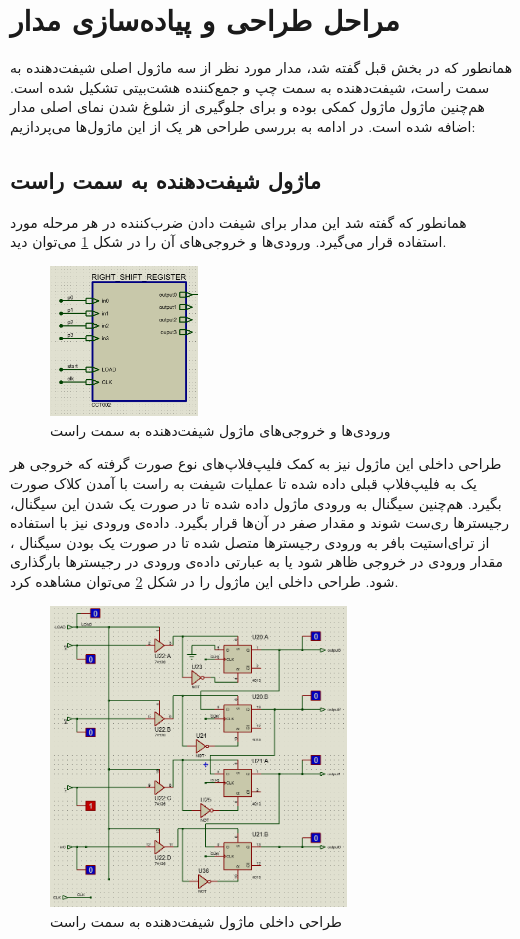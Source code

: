 \documentclass[12pt,onecolumn,a4paper,fleqn]{article}
\begin{document}
	\section{مراحل طراحی و پیاده‌سازی مدار}
	همانطور که در بخش قبل گفته شد، مدار مورد نظر از سه ماژول اصلی شیفت‌دهنده به سمت راست، شیفت‌دهنده به سمت چپ و جمع‌کننده هشت‌بیتی تشکیل شده است. هم‌چنین ماژول  ماژول کمکی بوده و برای جلوگیری از شلوغ شدن نمای اصلی مدار اضافه شده است. در ادامه به بررسی طراحی هر یک از این ماژول‌ها می‌پردازیم:
	\subsection{ماژول شیفت‌دهنده به سمت راست}
همانطور که گفته شد این مدار برای شیفت دادن ضرب‌کننده در هر مرحله مورد استفاده قرار می‌گیرد. ورودی‌ها و خروجی‌های آن را در شکل \ref{fig:rshiftreg} می‌توان دید.
	\begin{figure}[H]
		\centering
		\includegraphics[width=0.35\textwidth]{source/rshiftreg.png}
		\caption{ورودی‌ها و خروجی‌های ماژول شیفت‌دهنده به سمت راست}
		\label{fig:rshiftreg}
	\end{figure}
	طراحی داخلی این ماژول نیز به کمک فلیپ‌فلاپ‌های نوع  صورت گرفته که خروجی هر یک به فلیپ‌فلاپ قبلی داده شده تا عملیات شیفت به راست با آمدن کلاک صورت بگیرد. هم‌چنین سیگنال  به ورودی  ماژول داده شده تا در صورت یک شدن این سیگنال، رجیسترها ری‌ست شوند و مقدار صفر در آن‌ها قرار بگیرد. داده‌ی ورودی نیز با استفاده از ترای‌استیت بافر به ورودی رجیسترها متصل شده تا در صورت یک بودن سیگنال ، مقدار ورودی در خروجی ظاهر شود یا به عبارتی داده‌ی ورودی در رجیسترها بارگذاری شود. طراحی داخلی این ماژول را در شکل \ref{fig:rshift_inner} می‌توان مشاهده کرد.
	\begin{figure}[H]
		\centering
		\includegraphics[width=0.7\textwidth]{source/rshift_inner.png}
		\caption{طراحی داخلی ماژول شیفت‌دهنده به سمت راست}
		\label{fig:rshift_inner}
	\end{figure}
\end{document}
